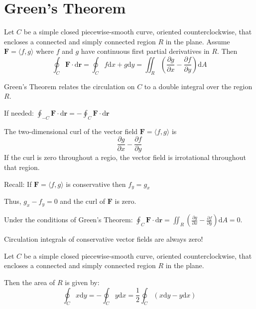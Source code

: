 \documentclass[../calc3.tex]{subfiles}
\begin{document}
\section{Green's Theorem}
\begin{theorem}
    Let $C$ be a simple closed piecewise-smooth curve, oriented counterclockwise, that encloses a connected and simply connected region 
    $R$ in the plane. Assume $\textbf{F}=\langle f,g\rangle$ where $f$ and $g$ have continuous first partial derivatives in $R$. Then 
    \[\oint_C \textbf{F}\cdot\mathrm{d}\textbf{r}=\oint_C f\mathrm{d}x+g\mathrm{d}y=\iint_R \left(\frac{\partial g}{\partial x}-\frac{\partial f}{\partial y}\right)\mathrm{d}A\]

    Green's Theorem relates the circulation on $C$ to a double integral over the region $R$.

    If needed: $\oint_{-C}\textbf{F}\cdot\mathrm{d}\textbf{r}=-\oint_C \textbf{F}\cdot\mathrm{d}\textbf{r}$
\end{theorem}

\begin{definition}
    The two-dimensional curl of the vector field $\textbf{F}=\langle f,g \rangle$ is 
    \[\frac{\partial g}{\partial x}-\frac{\partial f}{\partial y}\]
    If the curl is zero throughout a regio, the vector field is irrotational throughout that region.
\end{definition}

Recall: If $\textbf{F}=\langle f,g\rangle$ is conservative then $f_y = g_x$

Thus, $g_x-f_y=0$ and the curl of $\textbf{F}$ is zero.

Under the conditions of Green's Theorem: $\oint_C \textbf{F}\cdot\mathrm{d}\textbf{r}=\iint_R \left(\frac{\partial g}{\partial x}-\frac{\partial f}{\partial y}\right)\mathrm{d}A=0$.

Circulation integrals of conservative vector fields are always zero!

\begin{theorem}
    Let $C$ be a simple closed piecewise-smooth curve, oriented counterclockwise, that encloses a connected and simply connected region $R$ in the plane.

    Then the area of $R$ is given by:
    \[\oint_C x\mathrm{d}y = -\oint_C y\mathrm{d}x = \frac{1}{2}\oint_C (x\mathrm{d}y-y\mathrm{d}x)\]
\end{theorem}
\end{document}
